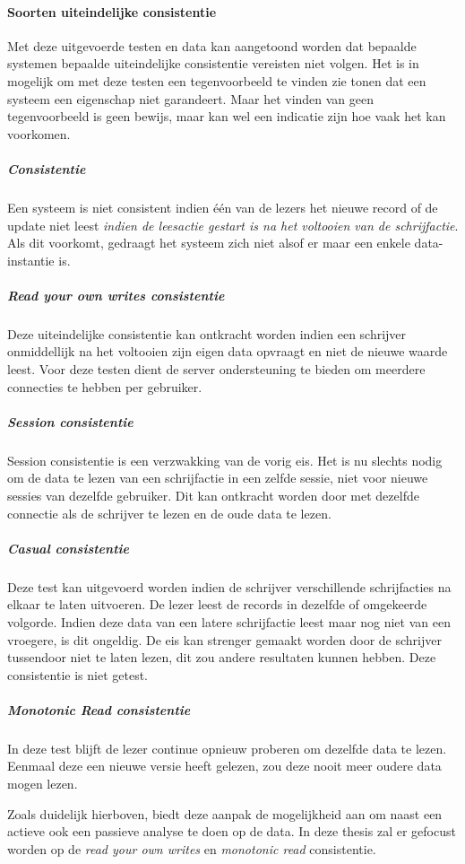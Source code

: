 \paragraph{Soorten uiteindelijke consistentie} Met deze uitgevoerde testen en data kan aangetoond worden dat bepaalde systemen bepaalde uiteindelijke consistentie vereisten niet volgen. Het is in mogelijk om met deze testen een tegenvoorbeeld te vinden zie tonen dat een systeem een eigenschap niet garandeert. Maar het vinden van geen tegenvoorbeeld is geen bewijs, maar kan wel een indicatie zijn hoe vaak het kan voorkomen. 

\subparagraph{Consistentie} Een systeem is niet consistent indien één van de lezers het nieuwe record of de update niet leest \textit{indien de leesactie gestart is na het voltooien van de schrijfactie}. Als dit voorkomt, gedraagt het systeem zich niet alsof er maar een enkele data-instantie is. 

\subparagraph{Read your own writes consistentie} Deze uiteindelijke consistentie kan ontkracht worden indien een schrijver onmiddellijk na het voltooien zijn eigen data opvraagt en niet de nieuwe waarde leest. Voor deze testen dient de server ondersteuning te bieden om meerdere connecties te hebben per gebruiker. 

\subparagraph{Session consistentie} Session consistentie is een verzwakking van de vorig eis. Het is nu slechts nodig om de data te lezen van een schrijfactie in een zelfde sessie, niet voor nieuwe sessies van dezelfde gebruiker. Dit kan ontkracht worden door met dezelfde connectie als de schrijver te lezen en de oude data te lezen. 

\subparagraph{Casual consistentie} Deze test kan uitgevoerd worden indien de schrijver verschillende schrijfacties na elkaar te laten uitvoeren. De lezer leest de records in dezelfde of omgekeerde volgorde. Indien deze data van een latere schrijfactie leest maar nog niet van een vroegere, is dit ongeldig. De eis kan strenger gemaakt worden door de schrijver tussendoor niet te laten lezen, dit zou andere resultaten kunnen hebben. Deze consistentie is niet getest. 

\subparagraph{Monotonic Read consistentie} In deze test blijft de lezer continue opnieuw proberen om dezelfde data te lezen. Eenmaal deze een nieuwe versie heeft gelezen, zou deze nooit meer oudere data mogen lezen. 

Zoals duidelijk hierboven, biedt deze aanpak de mogelijkheid aan om naast een actieve ook een passieve analyse te doen op de data. In deze thesis zal er gefocust worden op de \textit{read your own writes} en \textit{monotonic read} consistentie. 

